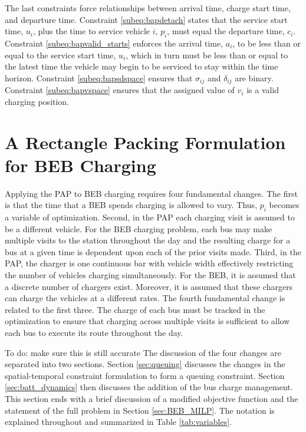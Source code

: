 \documentclass[utf8]{FrontiersinHarvard}
\newcommand{\TODO}[1]{{\color{green} To do: #1}}                                %
\begin{document}
The last constraints force relationships between arrival time, charge start time, and departure time. Constraint
\eqref{subeq:bapdetach} states that the service start time, $u_i$, plus the time to service vehicle $i$, $p_i$, must
equal the departure time, $c_i$. Constraint \eqref{subeq:bapvalid_starts} enforces the arrival time, $a_i$, to be less
than or equal to the service start time, $u_i$, which in turn must be less than or equal to the latest time the vehicle
may begin to be serviced to stay within the time horizon. Constraint \eqref{subeq:bapsdspace} ensures that $\sigma_{ij}$ and
$\delta_{ij}$ are binary. Constraint \eqref{subeq:bapvspace} ensures that the assigned value of $v_i$ is a valid charging
position.

%
\section{A Rectangle Packing Formulation for BEB Charging}  \label{sec:problemformulation}
Applying the PAP to BEB charging requires four fundamental changes. The first is that the time that a BEB spends
charging is allowed to vary. Thus, $p_i$ becomes a variable of optimization. Second, in the PAP each charging visit is
assumed to be a different vehicle. For the BEB charging problem, each bus may make multiple visits to the station
throughout the day and the resulting charge for a bus at a given time is dependent upon each of the prior visits made.
Third, in the PAP, the charger is one continuous bar with vehicle width effectively restricting the number of vehicles
charging simultaneously. For the BEB, it is assumed that a discrete number of chargers exist. Moreover, it is assumed
that these chargers can charge the vehicles at a different rates. The fourth fundamental change is related to the first
three. The charge of each bus must be tracked in the optimization to ensure that charging across multiple visits is
sufficient to allow each bus to execute its route throughout the day.

\TODO{make sure this is still accurate} The discussion of the four changes are separated into two sections. Section
\ref{sec:queuing} discusses the changes in the spatial-temporal constraint formulation to form a queuing constraint.
Section \ref{sec:batt_dynamics} then discusses the addition of the bus charge management. This section ends with a brief
discussion of a modified objective function and the statement of the full problem in Section \ref{sec:BEB_MILP}. The
notation is explained throughout and summarized in Table \ref{tab:variables}.
\end{document}
